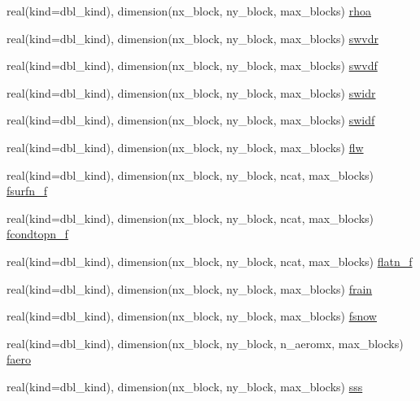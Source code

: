 \begin{DoxyCompactItemize}
\item 
real(kind=dbl\_\-kind), dimension(nx\_\-block, ny\_\-block, max\_\-blocks) \hyperlink{namespaceice__flux_ab8b07cf5accff1bc998fda8a9255f504}{rhoa}
\item 
real(kind=dbl\_\-kind), dimension(nx\_\-block, ny\_\-block, max\_\-blocks) \hyperlink{namespaceice__flux_af1a375e8ebfd339a67514570411f3562}{swvdr}
\item 
real(kind=dbl\_\-kind), dimension(nx\_\-block, ny\_\-block, max\_\-blocks) \hyperlink{namespaceice__flux_a8c5ea2d2d5d2cd3a07df830e1b7df7c8}{swvdf}
\item 
real(kind=dbl\_\-kind), dimension(nx\_\-block, ny\_\-block, max\_\-blocks) \hyperlink{namespaceice__flux_a9062bc1d6f167d11fe38ea7308cea20b}{swidr}
\item 
real(kind=dbl\_\-kind), dimension(nx\_\-block, ny\_\-block, max\_\-blocks) \hyperlink{namespaceice__flux_aa83ef052badcc8ce13f5cdcfd363ae0d}{swidf}
\item 
real(kind=dbl\_\-kind), dimension(nx\_\-block, ny\_\-block, max\_\-blocks) \hyperlink{namespaceice__flux_a5a996f0c777a83d0532daa407dae18e5}{flw}
\item 
real(kind=dbl\_\-kind), dimension(nx\_\-block, ny\_\-block, ncat, max\_\-blocks) \hyperlink{namespaceice__flux_a248789dd1933e5c3a277f54582b46099}{fsurfn\_\-f}
\item 
real(kind=dbl\_\-kind), dimension(nx\_\-block, ny\_\-block, ncat, max\_\-blocks) \hyperlink{namespaceice__flux_af7ddfda012c0a29dc4624f3914ea09f9}{fcondtopn\_\-f}
\item 
real(kind=dbl\_\-kind), dimension(nx\_\-block, ny\_\-block, ncat, max\_\-blocks) \hyperlink{namespaceice__flux_a5538859203f81cabe03440a3b69f69a4}{flatn\_\-f}
\item 
real(kind=dbl\_\-kind), dimension(nx\_\-block, ny\_\-block, max\_\-blocks) \hyperlink{namespaceice__flux_a82a0812de1a89016e9cdb1b60e3cab05}{frain}
\item 
real(kind=dbl\_\-kind), dimension(nx\_\-block, ny\_\-block, max\_\-blocks) \hyperlink{namespaceice__flux_ada95784733af0019d97dc30baf7511b4}{fsnow}
\item 
real(kind=dbl\_\-kind), dimension(nx\_\-block, ny\_\-block, n\_\-aeromx, max\_\-blocks) \hyperlink{namespaceice__flux_ad99dce71f61486e2450ba1fc5318abb9}{faero}
\item 
real(kind=dbl\_\-kind), dimension(nx\_\-block, ny\_\-block, max\_\-blocks) \hyperlink{namespaceice__flux_a0549ab71dd5d6a3d23fc54b03daa9aba}{sss}
\item 

\end{DoxyCompactItemize}
